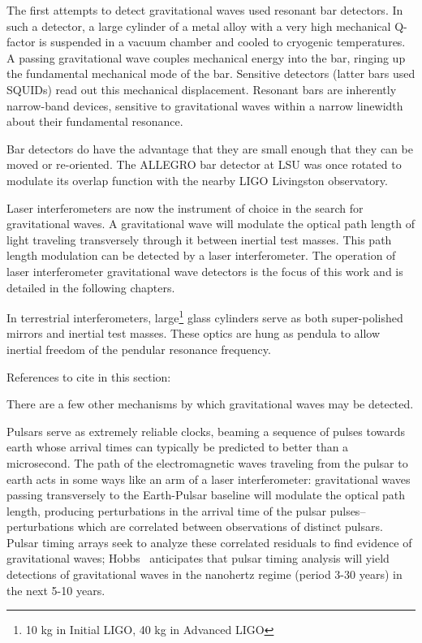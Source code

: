 The first attempts to detect gravitational waves used resonant bar
detectors.  In such a detector, a large cylinder of a metal alloy with
a very high mechanical Q-factor is suspended in a vacuum chamber and
cooled to cryogenic temperatures.  A passing gravitational wave
couples mechanical energy into the bar, ringing up the fundamental
mechanical mode of the bar.  Sensitive detectors (latter bars used
SQUIDs) read out this mechanical displacement.  Resonant bars are
inherently narrow-band devices, sensitive to gravitational waves
within a narrow linewidth about their fundamental resonance.

Bar detectors do have the advantage that they are small enough that
they can be moved or re-oriented.  The ALLEGRO bar detector at LSU was
once rotated to modulate its overlap function with the nearby LIGO
Livingston observatory.


Laser interferometers are now the instrument of choice in the search
for gravitational waves.  A gravitational wave will modulate the
optical path length of light traveling transversely through it between
inertial test masses.  This path length modulation can be detected by
a laser interferometer.  The operation of laser interferometer
gravitational wave detectors is the focus of this work and is detailed
in the following chapters.

In terrestrial interferometers, large\footnote{10 kg in Initial LIGO,
  40 kg in Advanced LIGO} glass cylinders serve as both super-polished
mirrors and inertial test masses.  These optics are hung as pendula to
allow inertial freedom of the pendular resonance frequency.

References to cite in this section: \cite{Weiss1972Electromagnetically,Forward1978Wideband}


There are a few other mechanisms by which gravitational waves may be
detected.

Pulsars serve as extremely reliable clocks, beaming a sequence of
pulses towards earth whose arrival times can typically be predicted to
better than a microsecond.  The path of the electromagnetic waves
traveling from the pulsar to earth acts in some ways like an arm of a
laser interferometer: gravitational waves passing transversely to the
Earth-Pulsar baseline will modulate the optical path length, producing
perturbations in the arrival time of the pulsar pulses--perturbations
which are correlated between observations of distinct pulsars. Pulsar
timing arrays seek to analyze these correlated residuals to find
evidence of gravitational waves;
Hobbs~\cite{Hobbs2009International} anticipates that pulsar timing
analysis will yield detections of gravitational waves in the nanohertz
regime (period 3-30 years) in the next 5-10 years.

